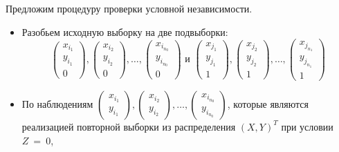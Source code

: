 Предложим процедуру проверки условной независимости.
\begin{itemize}
    \item Разобьем исходную выборку на две подвыборки:
    $$
    \begin{pmatrix}
            x_{i_1} \\
            y_{i_1} \\
            0
        \end{pmatrix},
        \begin{pmatrix}
            x_{i_2} \\
            y_{i_2} \\
            0
        \end{pmatrix}, \ldots,
        \begin{pmatrix}
            x_{i_{n_0}} \\
            y_{i_{n_0}} \\
            0
        \end{pmatrix}
    \text{ и }
    \begin{pmatrix}
            x_{j_1} \\
            y_{j_1} \\
            1
        \end{pmatrix},
        \begin{pmatrix}
            x_{j_2} \\
            y_{j_2} \\
            1
        \end{pmatrix}, \ldots,
        \begin{pmatrix}
            x_{j_{n_1}} \\
            y_{j_{n_1}} \\
            1
        \end{pmatrix}
    $$
    \item По наблюдениям 
    $
    \begin{pmatrix}
        x_{i_1} \\
        y_{i_1} 
    \end{pmatrix},
    \begin{pmatrix}
        x_{i_2} \\
        y_{i_2}
    \end{pmatrix}, \ldots,
    \begin{pmatrix}
        x_{i_{n_0}} \\
        y_{i_{n_0}}
    \end{pmatrix}
    $, которые являются реализацией повторной выборки
    из распределения $(X,Y)^T$ при условии $Z~=~0$,

\end{itemize}
